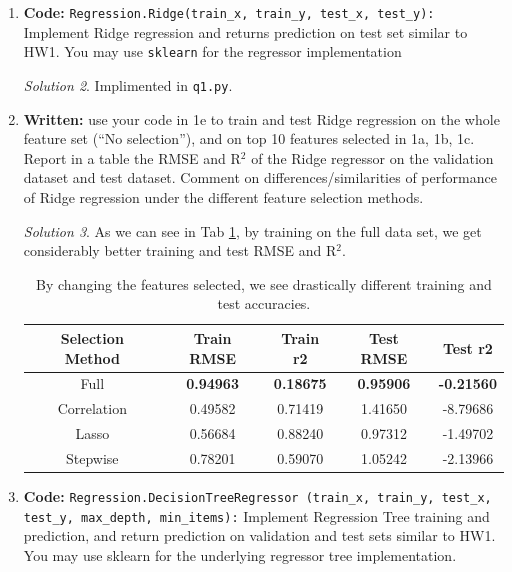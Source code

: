 \documentclass[a4paper,12pt]{article}
\theoremstyle{definition}
\theoremstyle{remark}
\newtheorem*{solution}{Solution}
\begin{document}
\begin{enumerate}
\begin{enumerate}
\begin{solution}
				Additionally, while {\tt lasso} and {\tt stepwise} have very similar results, {\tt stepwise} took noticibly longer to compute.
			\end{solution}
			\item {\bf Code:} {\tt Regression.Ridge(train\_x, train\_y, test\_x, test\_y):} Implement Ridge regression and returns prediction on test set similar to HW1. You may use {\tt sklearn} for the regressor implementation
			\begin{solution}
				 Implimented in \texttt{q1.py}.
			\end{solution}
			\item {\bf Written:} use your code in 1e to train and test Ridge regression on the whole feature set (“No selection”), and on
			top 10 features selected in 1a, 1b, 1c. Report in a table the RMSE and R$^2$ of the Ridge regressor on the
			validation dataset and test dataset. Comment on differences/similarities of performance of Ridge regression
			under the different feature selection methods.
			\begin{solution}
				As we can see in Tab \ref{tab:selectionmethods}, by training on the full data set, we get considerably better training and test RMSE and R$^2$.
			\begin{table}
				\centering
				\begin{tabular}{|c|c|c|c|c|}
					\hline
					Selection Method&Train RMSE  &Train r2  &Test RMSE  & Test r2  \\
					\hline\hline
					Full& {\bf 0.94963}& {\bf0.18675} & {\bf0.95906} & {\bf -0.21560}\\
					Correlation&	0.49582  & 0.71419 & 1.41650 & -8.79686 \\
					Lasso&  0.56684& 0.88240 &  0.97312& -1.49702 \\
					Stepwise&  0.78201& 0.59070 & 1.05242 & -2.13966 \\
					\hline
				\end{tabular}
				\caption{By changing the features selected, we see drastically different training and test accuracies.}
				\label{tab:selectionmethods}
			\end{table}
			\end{solution}
			\item {\bf Code:} {\tt Regression.DecisionTreeRegressor (train\_x, train\_y, test\_x, test\_y, max\_depth, min\_items):}
			Implement Regression Tree training and prediction, and return prediction on validation and test sets similar to
			HW1. You may use sklearn for the underlying regressor tree implementation.

\end{enumerate}
\end{enumerate}
\end{document}
